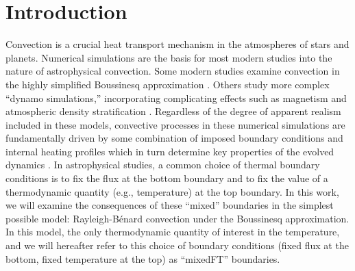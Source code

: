 \documentclass[aps, pre, onecolumn, nofootinbib, notitlepage, groupedaddress, amsfonts, amssymb, amsmath, longbibliography]{revtex4-1}
\newcommand{\RB}{Rayleigh-B\'{e}nard }
\begin{document}

\section{Introduction}
\label{sec:introduction}
Convection is a crucial heat transport mechanism in the atmospheres of stars and planets.
Numerical simulations are the basis for most modern studies into the nature of astrophysical convection.
Some modern studies examine convection in the highly simplified Boussinesq approximation \cite{spiegel&veronis1960}.
Others study more complex ``dynamo simulations,'' incorporating complicating effects such as magnetism and atmospheric density stratification \cite{charbonneau2014, toomre2019}.
Regardless of the degree of apparent realism included in these models, convective processes in these numerical simulations are fundamentally driven by some combination of imposed boundary conditions and internal heating profiles which in turn determine key properties of the evolved dynamics \cite{goluskin2015}.
In astrophysical studies, a common choice of thermal boundary conditions \cite{glatzmaier&gilman1982, hurlburt&all1986, cattaneo&all1990, featherstone&hindman2016a, korre&all2019, wood&brummell2018, kapyla&all2019} is to fix the flux at the bottom boundary and to fix the value of a thermodynamic quantity (e.g., temperature) at the top boundary.
In this work, we will examine the consequences of these ``mixed'' boundaries in the simplest possible model: \RB convection under the Boussinesq approximation.
In this model, the only thermodynamic quantity of interest in the temperature, and we will hereafter refer to this choice of boundary conditions (fixed flux at the bottom, fixed temperature at the top) as ``mixedFT'' boundaries.
\end{document}
